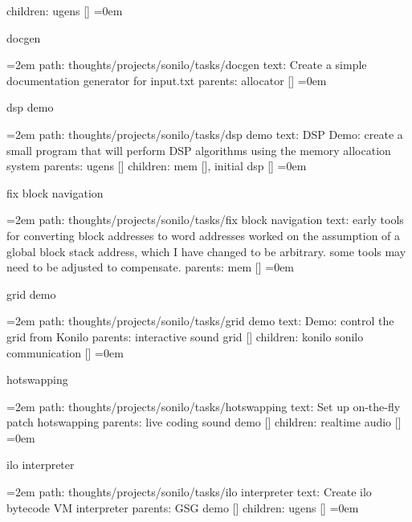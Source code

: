 children: ugens []
\smallskip
\leftskip=0em
\par\endgroup
\bigskip
{}
docgen
\smallskip
\par\begingroup
\leftskip=2em
path: thoughts/projects/sonilo/tasks/docgen
\smallskip
text:  Create a simple documentation generator for input.txt
\smallskip
parents:  allocator []
\smallskip
\leftskip=0em
\par\endgroup
\bigskip
{}
dsp demo
\smallskip
\par\begingroup
\leftskip=2em
path: thoughts/projects/sonilo/tasks/dsp demo
\smallskip
text:  DSP Demo: create a small program that will perform DSP algorithms using the memory allocation system
\smallskip
parents:  ugens []
\smallskip
children: mem [], initial dsp []
\smallskip
\leftskip=0em
\par\endgroup
\bigskip
{}
fix block navigation
\smallskip
\par\begingroup
\leftskip=2em
path: thoughts/projects/sonilo/tasks/fix block navigation
\smallskip
text:  early tools for converting block addresses to word addresses worked on the assumption of a global block stack address, which I have changed to be arbitrary. some tools may need to be adjusted to compensate.
\smallskip
parents:  mem []
\smallskip
\leftskip=0em
\par\endgroup
\bigskip
{}
grid demo
\smallskip
\par\begingroup
\leftskip=2em
path: thoughts/projects/sonilo/tasks/grid demo
\smallskip
text:  Demo: control the grid from Konilo
\smallskip
parents:  interactive sound grid []
\smallskip
children: konilo sonilo communication []
\smallskip
\leftskip=0em
\par\endgroup
\bigskip
{}
hotswapping
\smallskip
\par\begingroup
\leftskip=2em
path: thoughts/projects/sonilo/tasks/hotswapping
\smallskip
text:  Set up on-the-fly patch hotswapping
\smallskip
parents:  live coding sound demo []
\smallskip
children: realtime audio []
\smallskip
\leftskip=0em
\par\endgroup
\bigskip
{}
ilo interpreter
\smallskip
\par\begingroup
\leftskip=2em
path: thoughts/projects/sonilo/tasks/ilo interpreter
\smallskip
text:  Create ilo bytecode VM interpreter
\smallskip
parents:  GSG demo []
\smallskip
children: ugens []
\smallskip
\leftskip=0em
\par\endgroup
